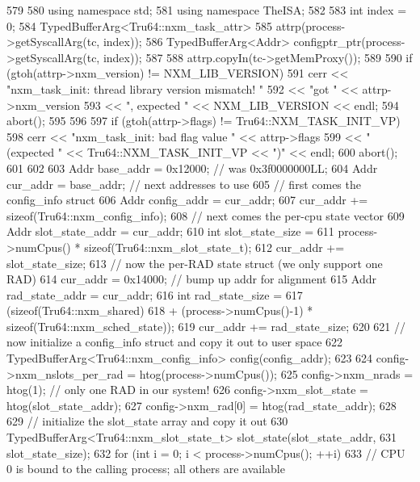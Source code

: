 \begin{DoxyCode}
579     {
580         using namespace std;
581         using namespace TheISA;
582 
583         int index = 0;
584         TypedBufferArg<Tru64::nxm_task_attr>
585             attrp(process->getSyscallArg(tc, index));
586         TypedBufferArg<Addr> configptr_ptr(process->getSyscallArg(tc, index));
587 
588         attrp.copyIn(tc->getMemProxy());
589 
590         if (gtoh(attrp->nxm_version) != NXM_LIB_VERSION) {
591             cerr << "nxm_task_init: thread library version mismatch! "
592                  << "got " << attrp->nxm_version
593                  << ", expected " << NXM_LIB_VERSION << endl;
594             abort();
595         }
596 
597         if (gtoh(attrp->flags) != Tru64::NXM_TASK_INIT_VP) {
598             cerr << "nxm_task_init: bad flag value " << attrp->flags
599                  << " (expected " << Tru64::NXM_TASK_INIT_VP << ")" << endl;
600             abort();
601         }
602 
603         Addr base_addr = 0x12000; // was 0x3f0000000LL;
604         Addr cur_addr = base_addr; // next addresses to use
605         // first comes the config_info struct
606         Addr config_addr = cur_addr;
607         cur_addr += sizeof(Tru64::nxm_config_info);
608         // next comes the per-cpu state vector
609         Addr slot_state_addr = cur_addr;
610         int slot_state_size =
611             process->numCpus() * sizeof(Tru64::nxm_slot_state_t);
612         cur_addr += slot_state_size;
613         // now the per-RAD state struct (we only support one RAD)
614         cur_addr = 0x14000;     // bump up addr for alignment
615         Addr rad_state_addr = cur_addr;
616         int rad_state_size =
617             (sizeof(Tru64::nxm_shared)
618              + (process->numCpus()-1) * sizeof(Tru64::nxm_sched_state));
619         cur_addr += rad_state_size;
620 
621         // now initialize a config_info struct and copy it out to user space
622         TypedBufferArg<Tru64::nxm_config_info> config(config_addr);
623 
624         config->nxm_nslots_per_rad = htog(process->numCpus());
625         config->nxm_nrads = htog(1);    // only one RAD in our system!
626         config->nxm_slot_state = htog(slot_state_addr);
627         config->nxm_rad[0] = htog(rad_state_addr);
628 
629         // initialize the slot_state array and copy it out
630         TypedBufferArg<Tru64::nxm_slot_state_t> slot_state(slot_state_addr,
631                                                            slot_state_size);
632         for (int i = 0; i < process->numCpus(); ++i) {
633             // CPU 0 is bound to the calling process; all others are available
}}
\end{DoxyCode}
